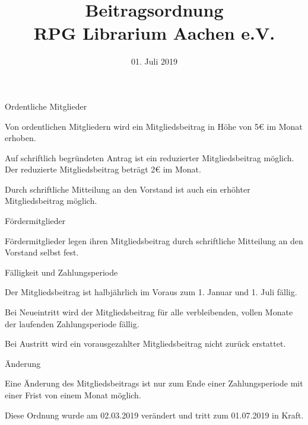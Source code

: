 \documentclass[11pt,a4paper,twoside,openany,article]{memoir}
\title{ Beitragsordnung \\ RPG Librarium Aachen e.V.}
\date{01. Juli 2019}
\begin{document}
  \maketitle
  \sloppy

\begin{para}{Ordentliche Mitglieder}
  \item Von ordentlichen Mitgliedern wird ein Mitgliedsbeitrag in Höhe von 5€ im Monat erhoben.
  \item Auf schriftlich begründeten Antrag ist ein reduzierter Mitgliedsbeitrag möglich. Der reduzierte Mitgliedsbeitrag beträgt 2€ im Monat.
  \item Durch schriftliche Mitteilung an den Vorstand ist auch ein erhöhter Mitgliedsbeitrag möglich.
\end{para}

\begin{para}{Fördermitglieder}
  \item Fördermitglieder legen ihren Mitgliedsbeitrag durch schriftliche Mitteilung an den Vorstand selbst fest.
\end{para}

\begin{para}{Fälligkeit und Zahlungsperiode}
  \item Der Mitgliedsbeitrag ist halbjährlich im Voraus zum 1. Januar und 1. Juli fällig.
  \item Bei Neueintritt wird der Mitgliedsbeitrag für alle verbleibenden, vollen Monate der laufenden Zahlungsperiode fällig.
  \item Bei Austritt wird ein vorausgezahlter Mitgliedsbeitrag nicht zurück erstattet.
\end{para}

\begin{para} {Änderung}
  \item Eine Änderung des Mitgliedsbeitrags ist nur zum Ende einer Zahlungsperiode mit einer Frist von einem Monat möglich.
\end{para}

\begin{changes}
  \item Diese Ordnung wurde am 02.03.2019 verändert und tritt zum 01.07.2019 in Kraft.
\end{changes}
\end{document}
